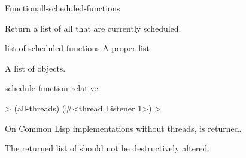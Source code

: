 \begin{functiondoc}{Function}{all-scheduled-functions}{\noargs{} 
    \returns{} }
%
%

\fnsyntax

\fnpurpose Return a list of all  that are
currently scheduled.

\fnpackage {}

\fnmodule {}

\fnargs
\begin{args}{list-of-scheduled-functions}
 A proper list
\end{args}

\fnreturns A list of  objects. 

\begin{alsos}{schedule-function-relative}
\end{alsos}

\fnexample
%
\W\supp
\begin{example}
  > (all-threads)
  (#<thread Listener 1>)
  >
\end{example}

\fnnotes On Common Lisp implementations without threads, \nil{} is returned.

The returned list of  should not be
destructively altered.

\end{functiondoc}


